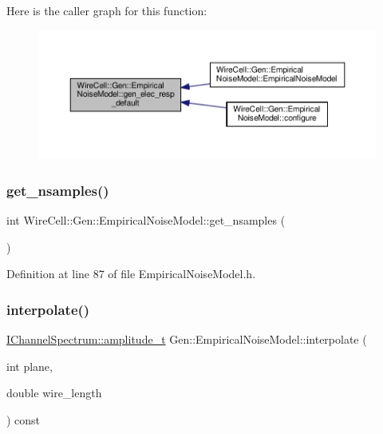 Here is the caller graph for this function\+:
\nopagebreak
\begin{figure}[H]
\begin{center}
\leavevmode
\includegraphics[width=350pt]{class_wire_cell_1_1_gen_1_1_empirical_noise_model_abf5f2823eb9522997306417ddd1d9ca4_icgraph}
\end{center}
\end{figure}
\mbox{\label{class_wire_cell_1_1_gen_1_1_empirical_noise_model_a29809eaa37653939840eda3863a66ac5}} 
\subsubsection{\texorpdfstring{get\+\_\+nsamples()}{get\_nsamples()}}
{\footnotesize\ttfamily int Wire\+Cell\+::\+Gen\+::\+Empirical\+Noise\+Model\+::get\+\_\+nsamples (\begin{DoxyParamCaption}{ }\end{DoxyParamCaption})\hspace{0.3cm}{\ttfamily [inline]}}



Definition at line 87 of file Empirical\+Noise\+Model.\+h.

\mbox{\label{class_wire_cell_1_1_gen_1_1_empirical_noise_model_a5b1d7a97da1b07237cf03b28a2caacdf}} 
\subsubsection{\texorpdfstring{interpolate()}{interpolate()}}
{\footnotesize\ttfamily \hyperlink{class_wire_cell_1_1_i_channel_spectrum_a9af7bfed961f49dc8a532fd5d0bf3e6e}{I\+Channel\+Spectrum\+::amplitude\+\_\+t} Gen\+::\+Empirical\+Noise\+Model\+::interpolate (\begin{DoxyParamCaption}\item[{int}]{plane,  }\item[{double}]{wire\+\_\+length }\end{DoxyParamCaption}) const}



